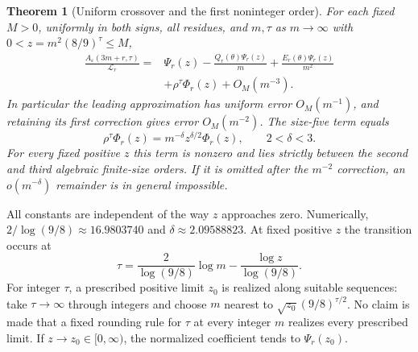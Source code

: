 \documentclass[11pt,letterpaper]{article}
\numberwithin{equation}{section}
\newtheorem{theorem}{Theorem}[section]
\theoremstyle{definition}\newtheorem{definition}[theorem]{Definition}
\theoremstyle{remark}\newtheorem{remark}[theorem]{Remark}
\newcommand{\eps}{\varepsilon}
\begin{document}
\begin{theorem}[Uniform crossover and the first noninteger order]
\label{det:dia:thm:crossover}
For each fixed $M>0$, uniformly in both signs, all residues, and
$m,\tau$ as $m\to\infty$ with $0<z=m^2(8/9)^\tau\leq M$,
\begin{equation}\label{det:dia:eq:crossover}
\begin{split}
 \frac{A_\eps(3m+r,\tau)}{\mathcal L_r}
 ={}&\Psi_r(z)-\frac{Q_r(\theta)\Psi_r(z)}m
 +\frac{E_r(\theta)\Psi_r(z)}{m^2}\\
 &+\rho^\tau\Phi_r(z)+O_M(m^{-3}).
\end{split}
\end{equation}
In particular the leading approximation has uniform error $O_M(m^{-1})$,
and retaining its first correction gives error $O_M(m^{-2})$.
The size-five term equals
\begin{equation}\label{det:dia:eq:deltaorder}
 \rho^\tau\Phi_r(z)=m^{-\delta}z^{\delta/2}\Phi_r(z),
 \qquad 2<\delta<3.
\end{equation}
For every fixed positive $z$ this term is nonzero and lies strictly
between the second and third algebraic finite-size orders. If it is
omitted after the $m^{-2}$ correction, an $o(m^{-\delta})$ remainder
is in general impossible.
\end{theorem}
All constants are independent of the way $z$ approaches zero. Numerically,
$2/\log(9/8)\approx16.9803740$ and $\delta\approx2.09588823$.
At fixed positive $z$ the transition occurs at
\begin{equation}\label{det:dia:eq:crossscale}
 \tau=\frac{2}{\log(9/8)}\log m-\frac{\log z}{\log(9/8)}.
\end{equation}
For integer $\tau$, a prescribed positive limit $z_0$ is realized along
suitable sequences: take $\tau\to\infty$ through integers and choose
$m$ nearest to $\sqrt{z_0}(9/8)^{\tau/2}$. No claim is made that a
fixed rounding rule for $\tau$ at every integer $m$ realizes every
prescribed limit. If $z\to z_0\in[0,\infty)$, the normalized coefficient
tends to $\Psi_r(z_0)$.
\end{document}
